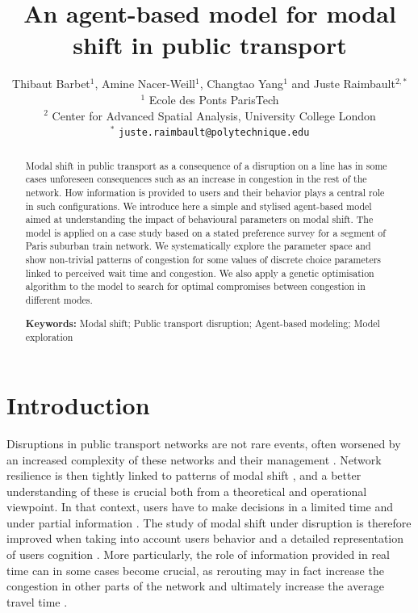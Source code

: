 \documentclass[10pt]{article}
\title{An agent-based model for modal shift in public transport}
\author{Thibaut Barbet$^{1}$, Amine Nacer-Weill$^{1}$, Changtao Yang$^{1}$ and Juste Raimbault$^{2,\ast}$\medskip\\
$^{1}$ Ecole des Ponts ParisTech\\
$^{2}$ Center for Advanced Spatial Analysis, University College London\medskip\\
$^{\ast}$ \texttt{juste.raimbault@polytechnique.edu}
}
\date{}
\begin{document}
\maketitle


\begin{abstract}
Modal shift in public transport as a consequence of a disruption on a line has in some cases unforeseen consequences such as an increase in congestion in the rest of the network. How information is provided to users and their behavior plays a central role in such configurations. We introduce here a simple and stylised agent-based model aimed at understanding the impact of behavioural parameters on modal shift. The model is applied on a case study based on a stated preference survey for a segment of Paris suburban train network. We systematically explore the parameter space and show non-trivial patterns of congestion for some values of discrete choice parameters linked to perceived wait time and congestion. We also apply a genetic optimisation algorithm to the model to search for optimal compromises between congestion in different modes.\\\medskip

\textbf{Keywords: } Modal shift; Public transport disruption; Agent-based modeling; Model exploration
\end{abstract}




\section{Introduction}



Disruptions in public transport networks are not rare events, often worsened by an increased complexity of these networks and their management \citep{dekker2018next}. Network resilience is then tightly linked to patterns of modal shift \citep{stamos2015impact}, and a better understanding of these is crucial both from a theoretical and operational viewpoint. In that context, users have to make decisions in a limited time and under partial information \citep{lyons2006role}. The study of modal shift under disruption is therefore improved when taking into account users behavior and a detailed representation of users cognition \citep{brisbois2010processus}. More particularly, the role of information provided in real time can in some cases become crucial, as rerouting may in fact increase the congestion in other parts of the network and ultimately increase the average travel time \citep{chatterjee2002driver,chorus2006travel}.
\end{document}
